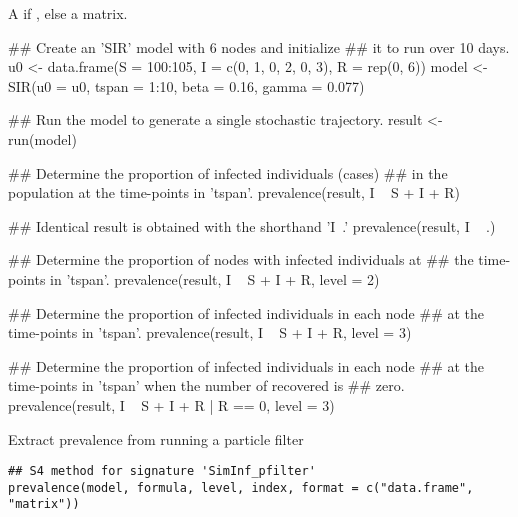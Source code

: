 \documentclass[letterpaper]{book}
\begin{document}
%
\begin{Value}
A  if , else
a matrix.
\end{Value}
%
\begin{Examples}
\begin{ExampleCode}
## Create an 'SIR' model with 6 nodes and initialize
## it to run over 10 days.
u0 <- data.frame(S = 100:105, I = c(0, 1, 0, 2, 0, 3), R = rep(0, 6))
model <- SIR(u0 = u0, tspan = 1:10, beta = 0.16, gamma = 0.077)

## Run the model to generate a single stochastic trajectory.
result <- run(model)

## Determine the proportion of infected individuals (cases)
## in the population at the time-points in 'tspan'.
prevalence(result, I ~ S + I + R)

## Identical result is obtained with the shorthand 'I~.'
prevalence(result, I ~ .)

## Determine the proportion of nodes with infected individuals at
## the time-points in 'tspan'.
prevalence(result, I ~ S + I + R, level = 2)

## Determine the proportion of infected individuals in each node
## at the time-points in 'tspan'.
prevalence(result, I ~ S + I + R, level = 3)

## Determine the proportion of infected individuals in each node
## at the time-points in 'tspan' when the number of recovered is
## zero.
prevalence(result, I ~ S + I + R | R == 0, level = 3)
\end{ExampleCode}
\end{Examples}
%
\begin{Description}
Extract prevalence from running a particle filter
\end{Description}
%
\begin{Usage}
\begin{verbatim}
## S4 method for signature 'SimInf_pfilter'
prevalence(model, formula, level, index, format = c("data.frame", "matrix"))
\end{verbatim}
\end{Usage}
%
\end{document}
